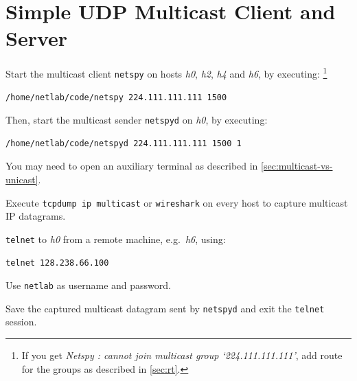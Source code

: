 \documentclass{../UTNetLab}
\begin{document}
\section{Simple UDP Multicast Client and Server}

    
    

    Start the multicast client \lstinline{netspy} on hosts \textit{h0}, \textit{h2}, \textit{h4} and \textit{h6}, by executing:%
    \footnote{If you get \textit{Netspy : cannot join multicast group `224.111.111.111'}, add route for the groups as described in \autoref{sec:rt}.}
    \begin{lstlisting}
/home/netlab/code/netspy 224.111.111.111 1500
    \end{lstlisting}
    
    Then, start the multicast sender \lstinline{netspyd} on \textit{h0}, by executing:
    \begin{lstlisting}
/home/netlab/code/netspyd 224.111.111.111 1500 1
    \end{lstlisting}
    You may need to open an auxiliary terminal as described in \autoref{sec:multicast-vs-unicast}.
    
    Execute \lstinline{tcpdump ip multicast} or \lstinline{wireshark} on every host to capture multicast IP datagrams.


    \lstinline{telnet} to \textit{h0} from a remote machine, e.g.\ \textit{h6}, using:
    \begin{lstlisting}
telnet 128.238.66.100
    \end{lstlisting}
    Use \texttt{netlab} as username and password.

    Save the captured multicast datagram sent by \lstinline{netspyd} and exit the \lstinline{telnet} session.
\end{document}
